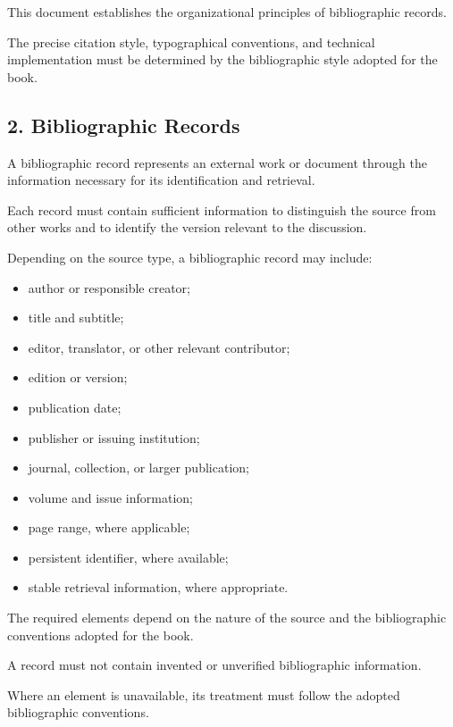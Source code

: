 This document establishes the
organizational principles of
bibliographic records.

The precise citation style,
typographical conventions,
and technical implementation
must be determined by the
bibliographic style adopted
for the book.


\subsection*{2. Bibliographic Records}

A bibliographic record represents
an external work or document
through the information necessary
for its identification and retrieval.

Each record must contain sufficient
information to distinguish the
source from other works and to
identify the version relevant
to the discussion.

Depending on the source type,
a bibliographic record may include:

\begin{itemize}
    \item author or responsible creator;
    \item title and subtitle;
    \item editor, translator,
    or other relevant contributor;
    \item edition or version;
    \item publication date;
    \item publisher or issuing institution;
    \item journal, collection,
    or larger publication;
    \item volume and issue information;
    \item page range, where applicable;
    \item persistent identifier,
    where available;
    \item stable retrieval information,
    where appropriate.
\end{itemize}

The required elements depend
on the nature of the source
and the bibliographic conventions
adopted for the book.

A record must not contain
invented or unverified
bibliographic information.

Where an element is unavailable,
its treatment must follow the
adopted bibliographic conventions.

